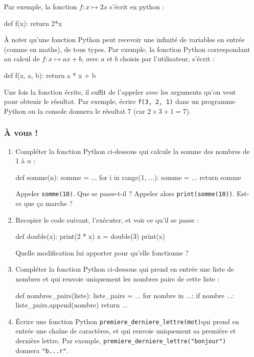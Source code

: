 \documentclass[12pt,a4paper, oneside]{article}
\begin{document}
   Par exemple, la fonction $f:x\mapsto 2x$ s'écrit en python :
   \begin{pyverbatim}
     def f(x):
       return 2*x
   \end{pyverbatim}

   À noter qu'une fonction Python peut recevoir une infinité de variables en entrée (comme en maths), de tous types.
      Par exemple, la fonction Python correspondant au calcul de ${f : x\mapsto ax+b}$, avec $a$ et $b$ choisis par l'utilisateur, s'écrit :
   \begin{pyverbatim}
     def f(x, a, b):
       return a * x + b
   \end{pyverbatim}
      
      Une fois la fonction écrite, il suffit de l'appeler avec les arguments qu'on veut pour obtenir le résultat.
      Par exemple, écrire \texttt{f(3, 2, 1)} dans un programme Python ou la console donnera le résultat $7$ (car $2\times 3 + 1 = 7$).
   
   \subsubsection*{À vous !}
   \begin{enumerate}
      \item Compléter la fonction Python ci-dessous qui calcule la somme des nombres de 1 à $n$ :
         \begin{pyverbatim}
           def somme(n):
             somme = ...
             for i in range(1, ...):
               somme = ...
             return somme
         \end{pyverbatim}
      Appeler \texttt{somme(10)}.
      Que se passe-t-il ?
      Appeler alors \texttt{print(somme(10))}.
      Est-ce que ça marche ?
      \item Recopier le code suivant, l'exécuter, et voir ce qu'il se passe :
         \begin{pyverbatim}
            def double(x):
               print(2 * x)
            x = double(3)
            print(x)
         \end{pyverbatim}
      Quelle modification lui apporter pour qu'elle fonctionne ?
      \item Compléter la fonction Python ci-dessous qui prend en entrée une liste de nombres et qui renvoie uniquement les nombres pairs de cette liste :
         \begin{pyverbatim}
            def nombres_pairs(liste):
                liste_pairs = ...
                for nombre in ...:
                    if nombre ...:
                        liste_pairs.append(nombre)
                return ...
         \end{pyverbatim}
      \item Écrire une fonction Python \texttt{premiere\_derniere\_lettre(mot)}qui prend en entrée une chaîne de caractères, et qui renvoie uniquement sa première et dernière lettre.
      Par exemple, \texttt{premiere\_derniere\_lettre("bonjour")} donnera \texttt{"b...r"}.
   \end{enumerate}
\end{document}
